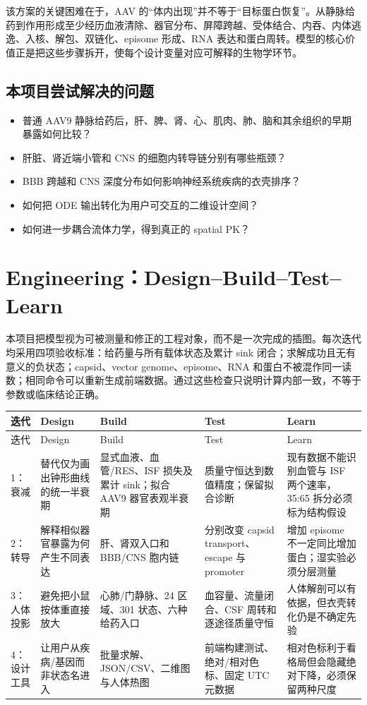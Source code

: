 \documentclass[UTF8,11pt,a4paper]{ctexart}
\begin{document}
该方案的关键困难在于，AAV 的“体内出现”并不等于“目标蛋白恢复”。从静脉给药到作用形成至少经历血液清除、器官分布、屏障跨越、受体结合、内吞、内体逃逸、入核、解包、双链化、episome 形成、RNA 表达和蛋白周转。模型的核心价值正是把这些步骤拆开，使每个设计变量对应可解释的生物学环节。

\subsection{本项目尝试解决的问题}
\begin{itemize}
  \item 普通 AAV9 静脉给药后，肝、脾、肾、心、肌肉、肺、脑和其余组织的早期暴露如何比较？
  \item 肝脏、肾近端小管和 CNS 的细胞内转导链分别有哪些瓶颈？
  \item BBB 跨越和 CNS 深度分布如何影响神经系统疾病的衣壳排序？
  \item 如何把 ODE 输出转化为用户可交互的二维设计空间？
  \item 如何进一步耦合流体力学，得到真正的 spatial PK？
\end{itemize}

\section{Engineering：Design--Build--Test--Learn}

本项目把模型视为可被测量和修正的工程对象，而不是一次完成的插图。每次迭代均采用四项验收标准：给药量与所有载体状态及累计 sink 闭合；求解成功且无有意义的负状态；capsid、vector genome、episome、RNA 和蛋白不被混作同一读数；相同命令可以重新生成前端数据。通过这些检查只说明计算内部一致，不等于参数或临床结论正确。

\small
\begin{longtable}{p{}p{}p{}p{}p{}}
\toprule
迭代 & Design & Build & Test & Learn \\
\midrule
\endfirsthead
\toprule
迭代 & Design & Build & Test & Learn \\
\midrule
\endhead
1：衰减 & 替代仅为画出钟形曲线的统一半衰期 & 显式血液、血管/RES、ISF 损失及累计 sink；拟合 AAV9 器官表观半衰期 & 质量守恒达到数值精度；保留拟合诊断 & 现有数据不能识别血管与 ISF 两个速率，35:65 拆分必须标为结构假设 \\
2：转导 & 解释相似器官暴露为何产生不同表达 & 肝、肾双入口和 BBB/CNS 胞内链 & 分别改变 capsid transport、escape 与 promoter & 增加 episome 不一定同比增加蛋白；湿实验必须分层测量 \\
3：人体投影 & 避免把小鼠按体重直接放大 & 心肺/门静脉、24 区域、301 状态、六种给药入口 & 血容量、流量闭合、CSF 周转和逐途径质量守恒 & 人体解剖可以有依据，但衣壳转化仍是不确定先验 \\
4：设计工具 & 让用户从疾病/基因而非状态名进入 & 批量求解、JSON/CSV、二维图与人体热图 & 前端构建测试、绝对/相对色标、固定 UTC 元数据 & 相对色标利于看格局但会隐藏绝对下降，必须保留两种尺度 \\
\bottomrule
\end{longtable}
\normalsize
\end{document}
